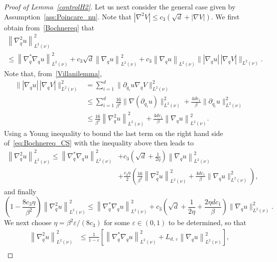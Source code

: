 \documentclass[AHL,Unicode,longabstracts,MathTools,published]{cedram}
\renewcommand{\leq}{\leqslant}
\begin{document}
\begin{proof}[Proof of Lemma~\ref{controlH2}]
Let us next consider the general case given by Assumption~\ref{ass:Poincare_nu}. Note that $|\nabla^2 V|\leq c_3(\sqrt{d}+|\nabla V|)$. We first obtain from~\eqref{Bochnereq} that
\begin{multline}\label{eq:Bochnereq_CS}
\left\|\nabla_q^2 u\right\|_{L^2(\nu)}^2 \\
\leq \left\|\nabla_q^{*}\nabla_q u \right\|_{L^2(\nu)}^2+ c_{3}\sqrt{d}\left\|\nabla_q u\right\|_{L^2(\nu)}^2 + c_{3}\left\|\nabla_q u\right\|_{L^2(\nu)}\big\| \left|\nabla_{q}u\right| \, \left| \nabla_{q}V\right| \big\|_{L^2(\nu)}.
\end{multline}
Note that, from~\eqref{Villanilemma},
\begin{align*}
\big\| \left|\nabla_{q}u\right| \, \left| \nabla_{q}V\right| \big\|_{L^2(\nu)}^2 & = \sum_{i=1}^d \big\| \partial_{q_i}u \nabla_{q}V \big\|_{L^2(\nu)}^2\\
&\leq \sum_{i=1}^d \frac{16}{\beta^2} \big\|\nabla \left(\partial_{q_i}u\right) \big\|^2_{L^2(\nu)} + \frac{4d c_1}{\beta} \big\|\partial_{q_i}u \big\|^2_{L^2(\nu)} \\
& \leq \frac{16}{\beta^2} \left\|\nabla_q^2 u \right\|^2_{L^2(\nu)} + \frac{4d c_1}{\beta} \left\|\nabla_q u \right\|^2_{L^2(\nu)}.
\end{align*}
Using a Young inequality to bound the last term on the right hand side of~\eqref{eq:Bochnereq_CS} with the inequality above then leads to
\begin{align*}
\left\|\nabla_q^2 u\right\|_{L^2(\nu)}^2 \leq \left\|\nabla_q^{*}\nabla_q u \right\|_{L^2(\nu)}^2 &+ c_{3} \left(\sqrt{d}+ \frac{1}{2\eta} \right) \left\|\nabla_q u\right\|_{L^2(\nu)}^2 \\
&+ \frac{c_3 \eta}{2} \left(\frac{16}{\beta^2} \left\|\nabla_q^2u\right\|_{L^2(\nu)}^2 + \frac{4dc_1}{\beta} \big\|\nabla_q u\big\|_{L^2(\nu)}^2\right),
\end{align*}
and finally
\[
\left(1 - \frac{8c_3 \eta}{\beta^2}\right)\left\|\nabla_q^2 u\right\|_{L^2(\nu)}^2 \leq \left\|\nabla_q^{*}\nabla_q u \right\|_{L^2(\nu)}^2 + c_3\left(\sqrt{d}+\frac{1}{2\eta} + \frac{2\eta dc_1}{\beta} \right) \big\|\nabla_q u\big\|_{L^2(\nu)}^2.
\]
We next choose $\eta = \beta^2\varepsilon/(8c_3)$ for some $\varepsilon \in (0,1)$ to be determined, so that
\begin{align*}
\left\|\nabla_q^2 u\right\|_{L^2(\nu)}^2 &\leq \frac{1}{1-\varepsilon} \left[\left\|\nabla_q^{*}\nabla_q u \right\|_{L^2(\nu)}^2 + L_{d,\,\varepsilon} \left\|\nabla_q u\right\|_{L^2(\nu)}^2\right],
\\

\end{align*}
\end{proof}
\end{document}

